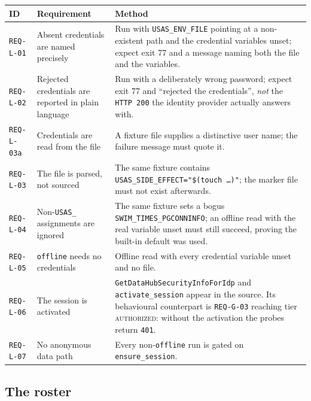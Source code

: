 \documentclass[12pt]{article}
\newcommand{\code}[1]{\texttt{#1}}
\newcommand{\req}[1]{\texttt{#1}}
\begin{document}
\begin{center}
\begin{longtable}{p{2.1cm}p{5.2cm}p{6.2cm}}
  \toprule
  \textbf{ID} & \textbf{Requirement} & \textbf{Method} \\
  \midrule\endhead
  \req{REQ-L-01} & Absent credentials are named precisely
    & Run with \code{USAS\_ENV\_FILE} pointing at a non-existent path
      and the credential variables unset; expect exit 77 and a message
      naming both the file and the variables. \\
  \req{REQ-L-02} & Rejected credentials are reported in plain language
    & Run with a deliberately wrong password; expect exit 77 and
      ``rejected the credentials'', \emph{not} the \code{HTTP 200} the
      identity provider actually answers with. \\
  \req{REQ-L-03a} & Credentials are read from the file
    & A fixture file supplies a distinctive user name; the failure
      message must quote it. \\
  \req{REQ-L-03} & The file is parsed, not sourced
    & The same fixture contains
      \code{USAS\_SIDE\_EFFECT="\$(touch \dots)"}; the marker file must
      not exist afterwards. \\
  \req{REQ-L-04} & Non-\code{USAS\_} assignments are ignored
    & The same fixture sets a bogus
      \code{SWIM\_TIMES\_PGCONNINFO}; an offline read with the real
      variable unset must still succeed, proving the built-in default
      was used. \\
  \req{REQ-L-05} & \code{offline} needs no credentials
    & Offline read with every credential variable unset and no file. \\
  \req{REQ-L-06} & The session is activated
    & \code{GetDataHubSecurityInfoForIdp} and \code{activate\_session}
      appear in the source.  Its behavioural counterpart is
      \req{REQ-G-03} reaching tier \textsc{authorized}: without the
      activation the probes return \code{401}. \\
  \req{REQ-L-07} & No anonymous data path
    & Every non-\code{offline} run is gated on \code{ensure\_session}. \\
  \bottomrule
\end{longtable}
\end{center}

\subsection{The roster}
\end{document}
